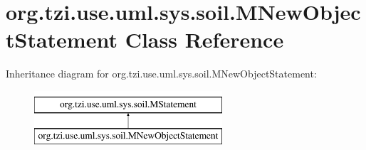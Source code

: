\hypertarget{classorg_1_1tzi_1_1use_1_1uml_1_1sys_1_1soil_1_1_m_new_object_statement}{\section{org.\-tzi.\-use.\-uml.\-sys.\-soil.\-M\-New\-Object\-Statement Class Reference}
\label{classorg_1_1tzi_1_1use_1_1uml_1_1sys_1_1soil_1_1_m_new_object_statement}
}
Inheritance diagram for org.\-tzi.\-use.\-uml.\-sys.\-soil.\-M\-New\-Object\-Statement\-:\begin{figure}[H]
\begin{center}
\leavevmode
\includegraphics[height=2.000000cm]{classorg_1_1tzi_1_1use_1_1uml_1_1sys_1_1soil_1_1_m_new_object_statement}
\end{center}
\end{figure}
